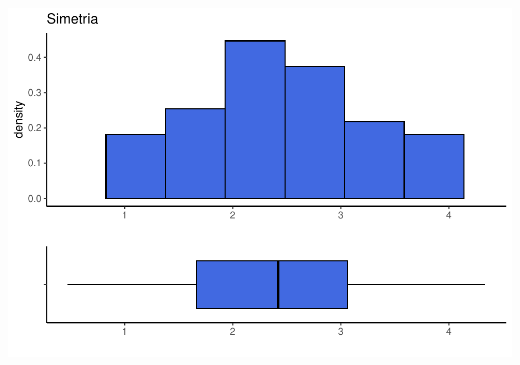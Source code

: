 \documentclass[
]{book}
\begin{document}
\begin{center}\includegraphics{AED_files/figure-latex/simetria-1} \end{center}
\end{document}
